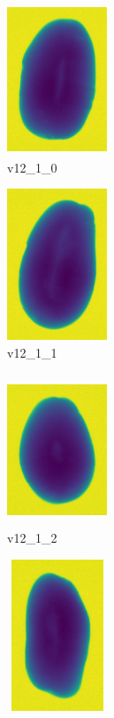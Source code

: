 \documentclass[11pt]{article}
\begin{document}
\begin{figure}
     \centering
     \begin{subfigure}[b]{0.15\textwidth}
         \centering
         \includegraphics[width=3cm, height=4.5cm]{images/kartofler/v12_1_0_cut.png}
         \caption{v12\_1\_0}
         \label{fig:y equals x}
     \end{subfigure}
     \hfill
     \begin{subfigure}[b]{0.15\textwidth}
         \centering
         \includegraphics[width=3cm, height=4.5cm]{images/kartofler/v12_1_1_cut.png}
        \caption{v12\_1\_1}
         \label{fig:three sin x}
     \end{subfigure}
     \hfill
     \begin{subfigure}[b]{0.15\textwidth}
         \centering
         \includegraphics[width=3cm, height=4.5cm]{images/kartofler/v12_1_2_cut.png}
        \caption{v12\_1\_2}
         \label{fig:five over x}
     \end{subfigure}
     \hfill
    \begin{subfigure}[b]{0.15\textwidth}
         \centering
         \includegraphics[width=3cm, height=4.5cm]{images/kartofler/v12_1_3_cut.png}

\end{subfigure}
\end{figure}
\end{document}
